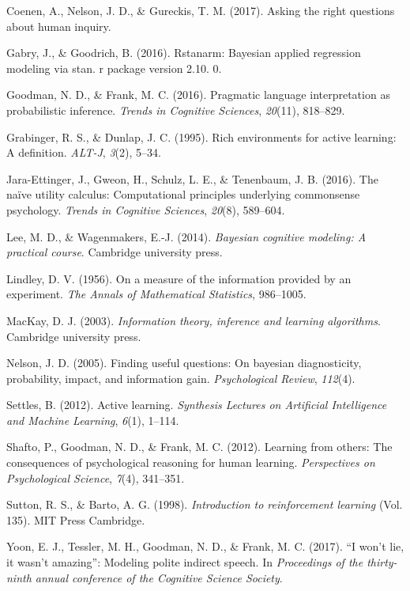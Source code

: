 \documentclass[10pt, letterpaper]{article}
\begin{document}
\hypertarget{ref-coenen2017}{}
Coenen, A., Nelson, J. D., \& Gureckis, T. M. (2017). Asking the right
questions about human inquiry.

\hypertarget{ref-gabry2016rstanarm}{}
Gabry, J., \& Goodrich, B. (2016). Rstanarm: Bayesian applied regression
modeling via stan. r package version 2.10. 0.

\hypertarget{ref-goodman2016}{}
Goodman, N. D., \& Frank, M. C. (2016). Pragmatic language
interpretation as probabilistic inference. \emph{Trends in Cognitive
Sciences}, \emph{20}(11), 818--829.

\hypertarget{ref-grabinger1995rich}{}
Grabinger, R. S., \& Dunlap, J. C. (1995). Rich environments for active
learning: A definition. \emph{ALT-J}, \emph{3}(2), 5--34.

\hypertarget{ref-jara2016}{}
Jara-Ettinger, J., Gweon, H., Schulz, L. E., \& Tenenbaum, J. B. (2016).
The naïve utility calculus: Computational principles underlying
commonsense psychology. \emph{Trends in Cognitive Sciences},
\emph{20}(8), 589--604.

\hypertarget{ref-lee2014bayesian}{}
Lee, M. D., \& Wagenmakers, E.-J. (2014). \emph{Bayesian cognitive
modeling: A practical course}. Cambridge university press.

\hypertarget{ref-lindley1956}{}
Lindley, D. V. (1956). On a measure of the information provided by an
experiment. \emph{The Annals of Mathematical Statistics}, 986--1005.

\hypertarget{ref-mackay2003}{}
MacKay, D. J. (2003). \emph{Information theory, inference and learning
algorithms}. Cambridge university press.

\hypertarget{ref-nelson2005}{}
Nelson, J. D. (2005). Finding useful questions: On bayesian
diagnosticity, probability, impact, and information gain.
\emph{Psychological Review}, \emph{112}(4).

\hypertarget{ref-settles2012active}{}
Settles, B. (2012). Active learning. \emph{Synthesis Lectures on
Artificial Intelligence and Machine Learning}, \emph{6}(1), 1--114.

\hypertarget{ref-shafto2012learning}{}
Shafto, P., Goodman, N. D., \& Frank, M. C. (2012). Learning from
others: The consequences of psychological reasoning for human learning.
\emph{Perspectives on Psychological Science}, \emph{7}(4), 341--351.

\hypertarget{ref-sutton1998}{}
Sutton, R. S., \& Barto, A. G. (1998). \emph{Introduction to
reinforcement learning} (Vol. 135). MIT Press Cambridge.

\hypertarget{ref-yoon2017}{}
Yoon, E. J., Tessler, M. H., Goodman, N. D., \& Frank, M. C. (2017). ``I
won't lie, it wasn't amazing'': Modeling polite indirect speech. In
\emph{Proceedings of the thirty-ninth annual conference of the Cognitive
Science Society}.
\end{document}

